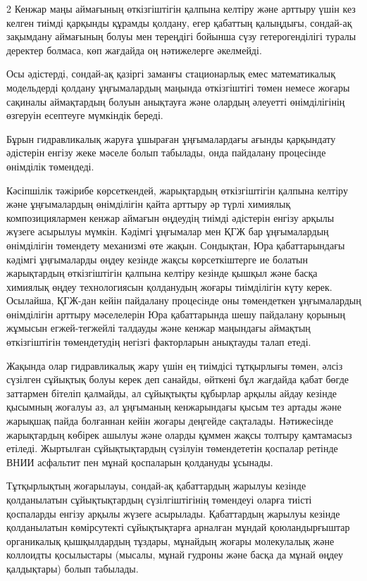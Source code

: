 \begin{multicols}{2}
Кенжар маңы аймағының өткізгіштігін қалпына келтіру және арттыру үшін
кез келген тиімді қарқынды құрамды қолдану, егер қабаттың қалыңдығы,
сондай-ақ зақымдану аймағының болуы мен тереңдігі бойынша сүзу
гетерогенділігі туралы деректер болмаса, көп жағдайда оң нәтижелерге
әкелмейді.

Осы әдістерді, сондай-ақ қазіргі заманғы стационарлық емес математикалық
модельдерді қолдану ұңғымалардың маңында өткізгіштігі төмен немесе
жоғары сақиналы аймақтардың болуын анықтауға және олардың әлеуетті
өнімділігінің өзгеруін есептеуге мүмкіндік береді.

Бұрын гидравликалық жаруға ұшыраған ұңғымалардағы ағынды қарқындату
әдістерін енгізу жеке мәселе болып табылады, онда пайдалану процесінде
өнімділік төмендеді.

Кәсіпшілік тәжірибе көрсеткендей, жарықтардың өткізгіштігін қалпына
келтіру және ұңғымалардың өнімділігін қайта арттыру әр түрлі химиялық
композициялармен кенжар аймағын өңдеудің тиімді әдістерін енгізу арқылы
жүзеге асырылуы мүмкін. Кәдімгі ұңғымалар мен ҚГЖ бар ұңғымалардың
өнімділігін төмендету механизмі өте жақын. Сондықтан, Юра қабаттарындағы
кәдімгі ұңғымаларды өңдеу кезінде жақсы көрсеткіштерге ие болатын
жарықтардың өткізгіштігін қалпына келтіру кезінде қышқыл және басқа
химиялық өңдеу технологиясын қолданудың жоғары тиімділігін күту керек.
Осылайша, ҚГЖ-дан кейін пайдалану процесінде оны төмендеткен
ұңғымалардың өнімділігін арттыру мәселелерін Юра қабаттарында шешу
пайдалану қорының жұмысын егжей-тегжейлі талдауды және кенжар маңындағы
аймақтың өткізгіштігін төмендетудің негізгі факторларын анықтауды талап
етеді.

Жақында олар гидравликалық жару үшін ең тиімдісі тұтқырлығы төмен, әлсіз
сүзілген сұйықтық болуы керек деп санайды, өйткені бұл жағдайда қабат
бөгде заттармен бітеліп қалмайды, ал сұйықтықты құбырлар арқылы айдау
кезінде қысымның жоғалуы аз, ал ұңғыманың кенжарындағы қысым тез артады
және жарықшақ пайда болғаннан кейін жоғары деңгейде сақталады.
Нәтижесінде жарықтардың көбірек ашылуы және оларды құммен жақсы толтыру
қамтамасыз етіледі. Жыртылған сұйықтықтардың сүзілуін төмендететін
қоспалар ретінде ВНИИ асфальтит пен мұнай қоспаларын қолдануды ұсынады.

Тұтқырлықтың жоғарылауы, сондай-ақ қабаттардың жарылуы кезінде
қолданылатын сұйықтықтардың сүзілгіштігінің төмендеуі оларға тиісті
қоспаларды енгізу арқылы жүзеге асырылады. Қабаттардың жарылуы кезінде
қолданылатын көмірсутекті сұйықтықтарға арналған мұндай қоюландырғыштар
органикалық қышқылдардың тұздары, мұнайдың жоғары молекулалық және
коллоидты қосылыстары (мысалы, мұнай гудроны және басқа да мұнай өңдеу
қалдықтары) болып табылады.


\end{multicols}
